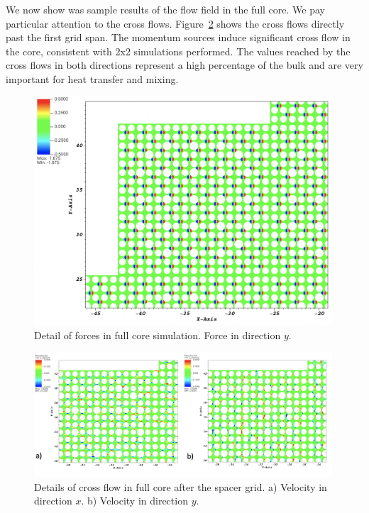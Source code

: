 We now show was sample results of the flow field in the full core. We pay particular attention to the cross flows. Figure~\ref{fig:msm1} shows the cross flows directly past the first grid span. The momentum sources induce significant cross flow in the core, consistent with 2x2 simulations performed. The values reached by the cross flows in both directions represent a high percentage of the bulk and are very important for heat transfer and mixing.

\begin{figure}[!ht]
\centering
\includegraphics[width=0.99\textwidth]{./figures/1span_msm.png}
\caption{Detail of forces in full core simulation. Force in direction $y$. }
\label{fig:msm}
\end{figure}

\begin{figure}[!ht]
\centering
\includegraphics[width=0.99\textwidth]{./figures/1span_msm_v1.png}
\caption{Details of cross flow in full core after the spacer grid. a) Velocity in direction $x$. b) Velocity in direction $y$. }
\label{fig:msm1}
\end{figure}

